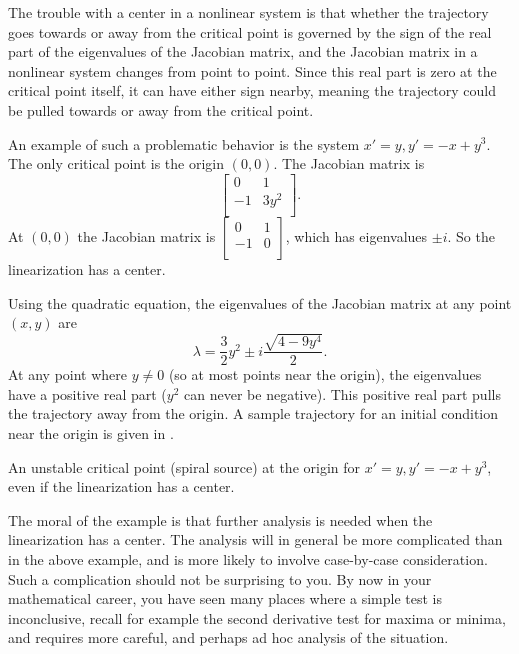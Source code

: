 The trouble with a center in a nonlinear system is that whether the
trajectory goes towards or away from the critical point is governed by the
sign of the real part of the eigenvalues of the Jacobian matrix, and the Jacobian
matrix
in a nonlinear system changes from point to point.  Since this real
part is zero at the critical point itself, it can have either sign nearby,
meaning the trajectory could be pulled towards or away from the critical
point.

\begin{example}
An example of such a problematic behavior is the system
$x'=y, y' = -x+y^3$.  The only critical point
is the origin $(0,0)$.  The Jacobian matrix is 
\begin{equation*}
\begin{bmatrix}
0 & 1 \\
-1 & 3 y^2 \\
\end{bmatrix} .
\end{equation*}
At 
$(0,0)$ the Jacobian matrix is
$\left[ \begin{smallmatrix}
0 & 1 \\
-1 & 0 \\
\end{smallmatrix} \right]$, which has eigenvalues $\pm i$.  So the
linearization has a center.

Using the quadratic equation, the eigenvalues of the
Jacobian matrix at any point $(x,y)$ are
\begin{equation*}
\lambda = 
\frac{3}{2}y^2 \pm
i
\frac{\sqrt{4-9y^4}}{2} .
\end{equation*}
At any point where $y \not= 0$ (so at most points near the origin), the eigenvalues have a positive real part ($y^2$ can
never be negative).  This positive real part 
pulls the trajectory away from the origin.  A sample trajectory for an
initial condition near the origin is given in
.
\begin{myfig}
\capstart
{}
\caption{An unstable critical point (spiral source) at the origin
for $x'=y, y' = -x+y^3$, even if the linearization has a center.  \label{fig:nlin-unstable-center}}
\end{myfig}
\end{example}

The moral of the example is that further analysis is needed when the
linearization has a center.  The analysis will in general be more
complicated than in the above example, and is more likely to involve
case-by-case consideration.  Such a complication should not be
surprising to you.  By now in your mathematical career, you have
seen many places where a simple test is inconclusive, recall for example
the second derivative test for maxima or minima, and requires more careful,
and perhaps ad hoc analysis of the situation.

